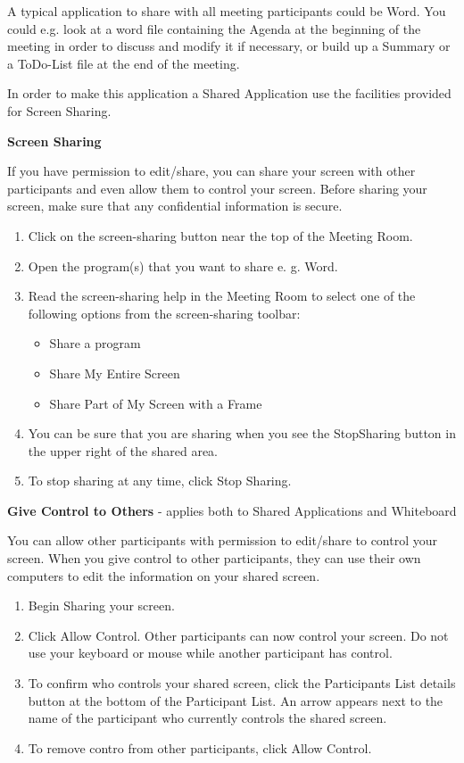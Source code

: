 \begin{htmlonly}
A typical application to share with all meeting participants could be Word. You could e.g. look at
a word file containing the Agenda at the beginning of the meeting in order to discuss and modify
it if necessary, or build up a Summary or a ToDo-List file at the end of the meeting.

In order to make this application a Shared Application use the facilities provided for Screen
Sharing.

\vspace{0.5cm}
{\bf Screen Sharing}
\vspace{0.5cm}  

If you have permission to edit/share, you can share your screen with other participants and even
allow them to control your screen. Before sharing your screen, make sure that any confidential
information is secure.

\begin{enumerate}
\item Click on the screen-sharing button near the top of the Meeting Room.
\item Open the program(s) that you want to share e. g. Word.
\item Read the screen-sharing help in the Meeting Room to select one of the following options from
the screen-sharing toolbar:
\begin{itemize}
\item Share a program
\item Share My Entire Screen
\item Share Part of My Screen with a Frame
\end{itemize}
\item You can be sure that you are sharing when you see the StopSharing button in the upper right
of the shared area.
\item To stop sharing at any time, click Stop Sharing.
\end{enumerate}

\vspace{0.5cm}
{\bf Give Control to Others} - applies both to Shared Applications and Whiteboard
\vspace{0.5cm}  

You can allow other participants with permission to edit/share to control your screen. When you
give control to other participants, they can use their own computers to edit the information on
your shared screen.
\begin{enumerate}
\item Begin Sharing your screen.
\item Click Allow Control. Other participants can now control your screen. Do not use your
keyboard or mouse while another participant has control.
\item To confirm who controls your shared screen, click the Participants List details button at
the bottom of the Participant List. An arrow appears next to the name of the participant who
currently controls the shared screen.  
\item To remove contro from other participants, click Allow Control.
\end{enumerate}



\end{htmlonly}
